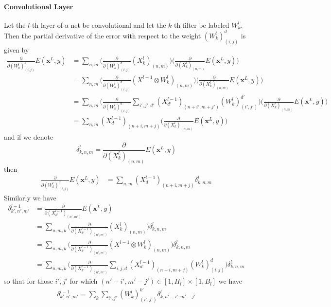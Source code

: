 \documentclass[preprint,12pt,3p]{elsarticle}
\begin{document}
\paragraph{Convolutional Layer} Let the $l$-th layer of a net be convolutional and let the $k$-th filter be labeled $W_k^l$. Then the partial derivative of the error with respect to the weight $(W_k^l)^d_{(i,j)}$ is given by
\begin{align*}
    \frac{\partial}{\partial(W_k^l)^d_{(i,j)}}E(\mathbf{x}^L,y)
    &=\sum_{n,m}\Big(\frac{\partial}{\partial (W_k^l)^d_{(i,j)}}  (X^l_k)_{(n,m)}\Big)\Big(\frac{\partial}{\partial (X^l_k)_{(n,m)}}E(\mathbf{x}^L,y)\Big)\\
    &=\sum_{n,m}\Big(\frac{\partial}{\partial (W_k^l)^d_{(i,j)}}  (X^{l-1}\otimes W_k^l)_{(n,m)}\Big)\Big(\frac{\partial}{\partial (X^l_k)_{(n,m)}}E(\mathbf{x}^L,y)\Big)\\
    &=\sum_{n,m}\Big(\frac{\partial}{\partial (W_k^l)^d_{(i,j)}}  \sum_{i',j',d'} (X^{l-1}_{d'})_{(n+i',m+j')}(W_k^l)^{d'}_{(i',j')}\Big)\Big(\frac{\partial}{\partial (X^l_k)_{(n,m)}}E(\mathbf{x}^L,y)\Big)\\
    &=\sum_{n,m} (X^{l-1}_{d})_{(n+i,m+j)}\Big(\frac{\partial}{\partial (X^l_k)_{(n,m)}}E(\mathbf{x}^L,y)\Big)
\end{align*}
and if we denote 
$$\delta_{k,n,m}^l=\frac{\partial}{\partial (X^l_k)_{(n,m)}}E(\mathbf{x}^L,y)$$
then 
\begin{align*}
    \frac{\partial}{\partial(W_k^l)^d_{(i,j)}}E(\mathbf{x}^L,y)&=\sum_{n,m} (X^{l-1}_{d})_{(n+i,m+j)}\delta_{k,n,m}^l
\end{align*}
Similarly we have
\begin{align*}
    \delta_{k',n',m'}^{l-1}
    &=\frac{\partial}{\partial (X^{l-1}_{k'})_{(n',m')}}E(\mathbf{x}^L,y)\\
    &=\sum_{n,m,k}\Big(\frac{\partial}{\partial (X^{l-1}_{k'})_{(n',m')}}(X^l_k)_{(n,m)}\Big)\delta_{k,n,m}^l\\
    &=\sum_{n,m,k}\Big(\frac{\partial}{\partial (X^{l-1}_{k'})_{(n',m')}}(X^{l-1}\otimes W_k^l)_{(n,m)}\Big)\delta_{k,n,m}^l\\
    &=\sum_{n,m,k}\Big(\frac{\partial}{\partial (X^{l-1}_{k'})_{(n',m')}}\sum_{i,j,d} (X^{l-1}_{d})_{(n+i,m+j)}(W_k^l)^{d}_{(i,j)}\Big)\delta_{k,n,m}^l
\end{align*}
so that for those $i',j'$ for which $(n'-i',m'-j')\in[1,H_l]\times[1,B_l]$ we have
\begin{align*}
    \delta_{k',n',m'}^{l-1}=\sum_k\sum_{i',j'}(W_k^l)^{k'}_{(i',j')}\delta_{k,n'-i',m'-j'}^l
\end{align*}
\end{document}
